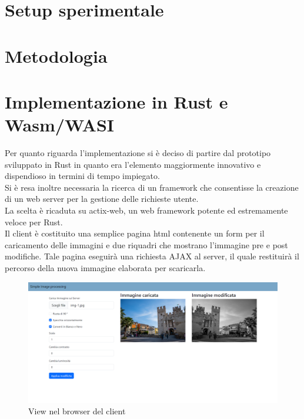 \section{Setup sperimentale}
\section{Metodologia}
\newpage
\section{Implementazione in Rust e Wasm/WASI}
Per quanto riguarda l'implementazione si è deciso di partire dal prototipo sviluppato in Rust in quanto era l'elemento maggiormente innovativo e dispendioso in termini di tempo impiegato.
\\Si è resa inoltre necessaria la ricerca di un framework che consentisse la creazione di un web server per la gestione delle richieste utente.
\\La scelta è ricaduta su actix-web, un web framework potente ed estremamente veloce per Rust.
\\Il client è costituito una semplice pagina html contenente un form per il caricamento delle immagini e due riquadri che mostrano l'immagine pre e post modifiche. Tale pagina eseguirà una richiesta AJAX al server, il quale restituirà il percorso della nuova immagine elaborata per scaricarla.
\begin{figure}
    \begin{center}
            \includegraphics[width=1\columnwidth]{images/client.png}
    \end{center}
    \caption{View nel browser del client}
    \label{fig:client}
\end{figure}
